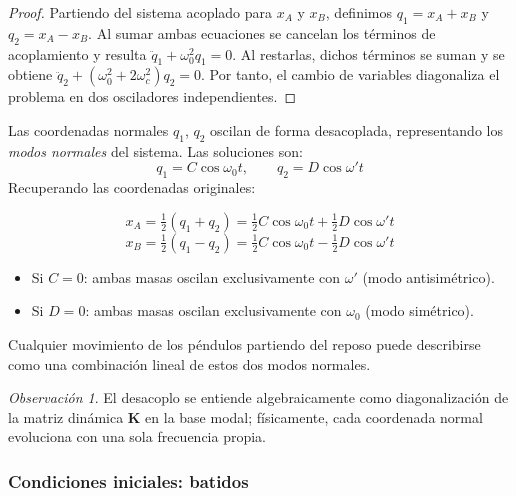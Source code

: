 \documentclass[12pt, a4paper]{article}
\theoremstyle{plain}
\theoremstyle{definition}
\theoremstyle{remark}
\newtheorem*{observacion}{Observación}
\begin{document}
\begin{proof}
Partiendo del sistema acoplado para $x_A$ y $x_B$, definimos
$q_1=x_A+x_B$ y $q_2=x_A-x_B$. Al sumar ambas ecuaciones se cancelan los términos de
acoplamiento y resulta $\ddot{q}_1+\omega_0^2q_1=0$. Al restarlas, dichos términos se suman y
se obtiene $\ddot{q}_2+(\omega_0^2+2\omega_c^2)q_2=0$. Por tanto, el cambio de variables
diagonaliza el problema en dos osciladores independientes.
\end{proof}

Las coordenadas normales $q_1$, $q_2$ oscilan de forma desacoplada, representando los
\emph{modos normales} del sistema. Las soluciones son:
\begin{equation}
  q_1 = C\cos\omega_0 t,\qquad q_2 = D\cos\omega' t
\end{equation}
Recuperando las coordenadas originales:
\begin{mdframed}[style=resultado]
\begin{equation}
  x_A = \tfrac{1}{2}(q_1+q_2) =
        \tfrac{1}{2}C\cos\omega_0 t + \tfrac{1}{2}D\cos\omega' t
\end{equation}
\begin{equation}
  x_B = \tfrac{1}{2}(q_1-q_2) =
        \tfrac{1}{2}C\cos\omega_0 t - \tfrac{1}{2}D\cos\omega' t
\end{equation}
\end{mdframed}

\begin{itemize}
  \item Si $C = 0$: ambas masas oscilan exclusivamente con $\omega'$ (modo antisimétrico).
  \item Si $D = 0$: ambas masas oscilan exclusivamente con $\omega_0$ (modo simétrico).
\end{itemize}

Cualquier movimiento de los péndulos partiendo del reposo puede describirse como una
combinación lineal de estos dos modos normales.
\begin{observacion}
El desacoplo se entiende algebraicamente como diagonalización de la matriz dinámica
$\mathbf{K}$ en la base modal; físicamente, cada coordenada normal evoluciona con una sola
frecuencia propia.
\end{observacion}

\subsubsection{Condiciones iniciales: batidos}
\end{document}
